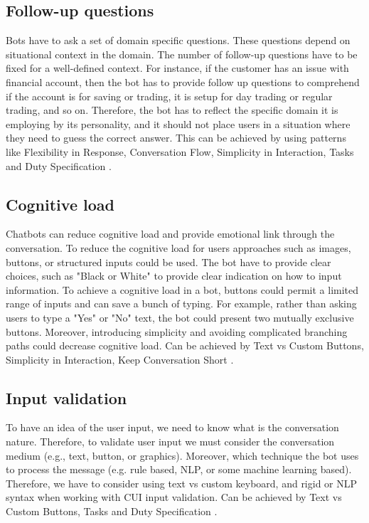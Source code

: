 \subsection{Follow-up questions}
Bots have to ask a set of domain specific questions. These questions depend on situational context in the domain. The number of follow-up questions have to be fixed for a well-defined context. For instance, if the customer has an issue with financial account, then the bot has to provide follow up questions to comprehend if the account is for saving or trading, it is setup for day trading or regular trading, and so on. Therefore, the bot has to reflect the specific domain it is employing by its personality, and it should not place users in a situation where they need to guess the correct answer. This can be achieved by using patterns like Flexibility in Response, Conversation Flow, Simplicity in Interaction, Tasks and Duty Specification \cite{fadhil2018}.

\subsection{Cognitive load}
Chatbots can reduce cognitive load and provide emotional link through the conversation. To reduce the cognitive load for users approaches such as images, buttons, or structured inputs could be used. The bot have to provide clear choices, such as "Black or White" to provide clear indication on how to input information. To achieve a cognitive load in a bot, buttons could permit a limited range of inputs and can save a bunch of typing. For example, rather than asking users to type a "Yes" or "No" text, the bot could present two mutually exclusive buttons. Moreover, introducing simplicity and avoiding complicated branching paths could decrease cognitive load. Can be achieved by Text vs Custom Buttons, Simplicity in Interaction, Keep Conversation Short \cite{fadhil2018}.


\subsection{Input validation}
To have an idea of the user input, we need to know what is the conversation nature. Therefore, to validate user input we must consider the conversation medium (e.g., text, button, or graphics). Moreover, which technique the bot uses to process the message (e.g. rule based, NLP, or some machine learning based). Therefore, we have to consider using text vs custom keyboard, and rigid or NLP syntax when working with CUI input validation. Can be achieved by Text vs Custom Buttons, Tasks and Duty Specification \cite{fadhil2018}.

